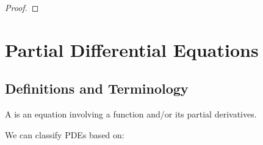 \begin{proof}

\end{proof}
\pagebreak

\chapter{Partial Differential Equations}
\section{Definitions and Terminology}
\begin{definition}
A  is an equation involving a function and/or its partial derivatives. 
\end{definition}

We can classify PDEs based on:
